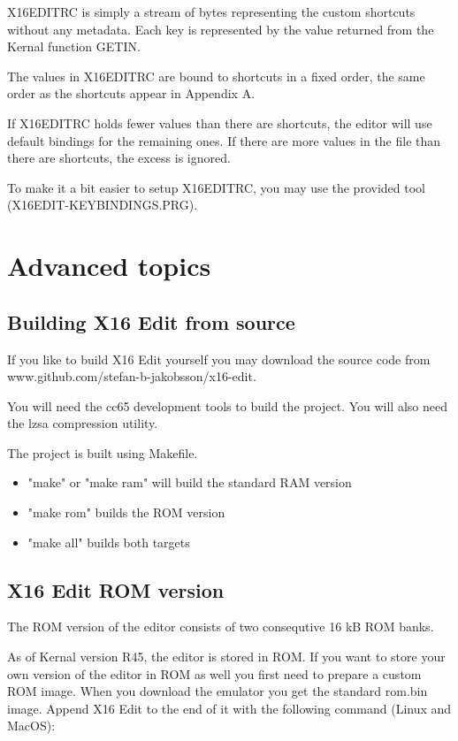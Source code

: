 \documentclass{article}
\begin{document}
        X16EDITRC is simply a stream of bytes representing the custom shortcuts without any metadata. 
        Each key is represented by the value returned from the Kernal function GETIN.
        
        The values in X16EDITRC are bound to shortcuts in a fixed order, the same order as
        the shortcuts appear in Appendix A.
        
        If X16EDITRC holds fewer values than there are shortcuts, the editor will use
        default bindings for the remaining ones. If there are more values in the file than there
        are shortcuts, the excess is ignored.
        
        To make it a bit easier to setup X16EDITRC, you may use the provided tool
        (X16EDIT-KEYBINDINGS.PRG).

\section{Advanced topics}

    \subsection{Building X16 Edit from source}
        If you like to build X16 Edit yourself you may download the source code from
        www.github.com/stefan-b-jakobsson/x16-edit.

        You will need the cc65 development tools to build the project. You will also need the lzsa compression utility.

        The project is built using Makefile.

        \begin{itemize}
            \item "make" or "make ram" will build the standard RAM version
            \item "make rom" builds the ROM version
            \item "make all" builds both targets
        \end{itemize}

    \subsection{X16 Edit ROM version}
        The ROM version of the editor consists of two consequtive 16 kB ROM banks.

        As of Kernal version R45, the editor is stored in ROM. If you want to store
        your own version of the editor in ROM as well you first need to prepare a custom ROM image. When you
        download the emulator you get the standard rom.bin image. Append
        X16 Edit to the end of it with the following command (Linux and MacOS):
\end{document}
